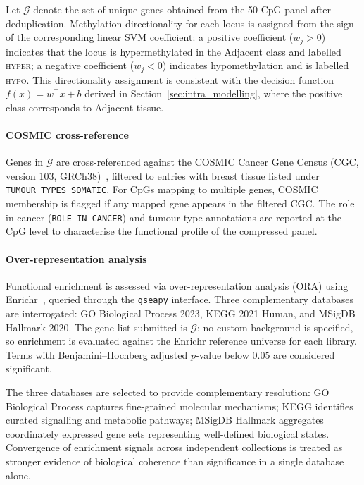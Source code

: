 Let $\mathcal{G}$ denote the set of unique genes obtained
from the 50-CpG panel after deduplication. Methylation
directionality for each locus is assigned from the sign of
the corresponding linear SVM coefficient: a positive
coefficient ($w_j > 0$) indicates that the locus is
hypermethylated in the Adjacent class and labelled
\textsc{hyper}; a negative coefficient ($w_j < 0$)
indicates hypomethylation and is labelled \textsc{hypo}.
This directionality assignment is consistent with the
decision function $f(x) = w^\top x + b$ derived in
Section~\ref{sec:intra_modelling}, where the positive class
corresponds to Adjacent tissue.

\paragraph{COSMIC cross-reference}

Genes in $\mathcal{G}$ are cross-referenced against the
COSMIC Cancer Gene Census (CGC, version 103,
GRCh38)~\cite{sondka2018cosmic}, filtered to entries with
breast tissue listed under \texttt{TUMOUR\_TYPES\_SOMATIC}.
For CpGs mapping to multiple genes, COSMIC membership is
flagged if any mapped gene appears in the filtered CGC.
The role in cancer (\texttt{ROLE\_IN\_CANCER}) and tumour
type annotations are reported at the CpG level to
characterise the functional profile of the compressed panel.

\paragraph{Over-representation analysis}

Functional enrichment is assessed via over-representation
analysis (ORA) using Enrichr~\cite{kuleshov2016enrichr},
queried through the \texttt{gseapy} interface. Three
complementary databases are interrogated: GO Biological
Process 2023, KEGG 2021 Human, and MSigDB Hallmark 2020.
The gene list submitted is $\mathcal{G}$; no custom
background is specified, so enrichment is evaluated against
the Enrichr reference universe for each library. Terms with
Benjamini--Hochberg adjusted $p$-value below $0.05$ are
considered significant.

The three databases are selected to provide complementary
resolution: GO Biological Process captures fine-grained
molecular mechanisms; KEGG identifies curated signalling and
metabolic pathways; MSigDB Hallmark aggregates
coordinately expressed gene sets representing well-defined
biological states. Convergence of enrichment signals across
independent collections is treated as stronger evidence of
biological coherence than significance in a single database
alone.


